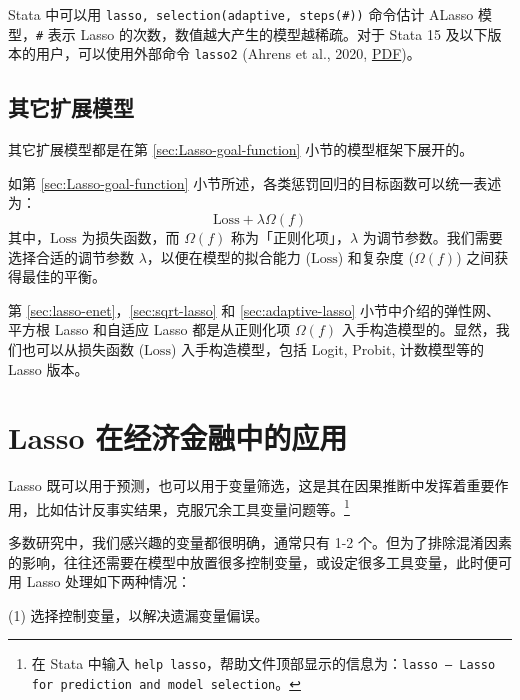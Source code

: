 Stata 中可以用 \texttt{lasso, selection(adaptive, steps(\#))} 命令估计 ALasso 模型，\texttt{\#} 表示 Lasso 的次数，数值越大产生的模型越稀疏。对于 Stata 15 及以下版本的用户，可以使用外部命令 \texttt{lasso2} (Ahrens et al., 2020, \href{http://sci-hub.ren/10.1177/1536867X20909697}{PDF})。



\subsection{其它扩展模型}

其它扩展模型都是在第 \ref{sec:Lasso-goal-function} 小节的模型框架下展开的。

如第 \ref{sec:Lasso-goal-function} 小节所述，各类惩罚回归的目标函数可以统一表述为：
\begin{equation}\label{eq:Lasso-08-a}
	\text{Loss}+\lambda \Omega(f)
\end{equation}
其中，$\text{Loss}$ 为损失函数，而 $\Omega(f)$ 称为「正则化项」，$\lambda$ 为调节参数。我们需要选择合适的调节参数 $\lambda$，以便在模型的拟合能力 ($\text{Loss}$) 和复杂度 ($\Omega(f)$) 之间获得最佳的平衡。

第 \ref{sec:lasso-enet}，\ref{sec:sqrt-lasso} 和  \ref{sec:adaptive-lasso} 小节中介绍的弹性网、平方根 Lasso 和自适应 Lasso 都是从正则化项 $\Omega(f)$ 入手构造模型的。显然，我们也可以从损失函数 ($\text{Loss}$) 入手构造模型，包括 Logit, Probit, 计数模型等的 Lasso 版本。 





\section{Lasso 在经济金融中的应用}\label{sec:lassoApp}
Lasso 既可以用于预测，也可以用于变量筛选，这是其在因果推断中发挥着重要作用，比如估计反事实结果，克服冗余工具变量问题等。\footnote{%
    在 Stata 中输入 \texttt{help lasso}，帮助文件顶部显示的信息为：\texttt{lasso -- Lasso for prediction and model selection}。}

多数研究中，我们感兴趣的变量都很明确，通常只有 1-2 个。但为了排除混淆因素的影响，往往还需要在模型中放置很多控制变量，或设定很多工具变量，此时便可用 Lasso 处理如下两种情况：

\vspace{5pt}
(1) 选择控制变量，以解决遗漏变量偏误。

